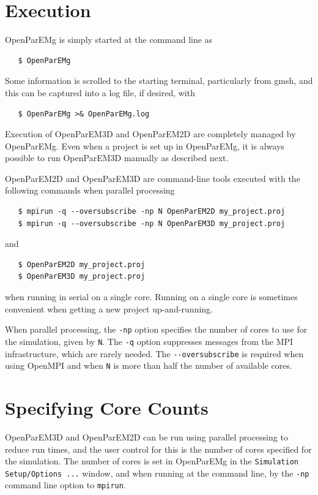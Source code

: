 \documentclass[titlepage]{article}
\renewcommand\_{\textunderscore\linebreak[1]}
\begin{document}
\section{Execution}

OpenParEMg is simply started at the command line as
\begin{verbatim}
   $ OpenParEMg
\end{verbatim}
Some information is scrolled to the starting terminal, particularly from gmsh, and this can be captured into a log file, if desired, with
\begin{verbatim}
   $ OpenParEMg >& OpenParEMg.log
\end{verbatim}
\noindent Execution of OpenParEM3D and OpenParEM2D are completely managed by OpenParEMg.  Even when a project is set up in OpenParEMg, it is always possible to run OpenParEM3D manually as described next.

OpenParEM2D and OpenParEM3D are command-line tools executed with the following commands when parallel processing
\begin{verbatim}
   $ mpirun -q --oversubscribe -np N OpenParEM2D my_project.proj 
   $ mpirun -q --oversubscribe -np N OpenParEM3D my_project.proj 
\end{verbatim}
and 
\begin{verbatim}
   $ OpenParEM2D my_project.proj
   $ OpenParEM3D my_project.proj
\end{verbatim}
when running in serial on a single core.  Running on a single core is sometimes convenient when getting a new project up-and-running.

When parallel processing, the \verb+-np+ option specifies the number of cores to use for the simulation, given by \verb+N+.  The \verb+-q+ option suppresses messages from the MPI infrastructure, which are rarely needed.  The \verb+--oversubscribe+ is required when using OpenMPI and when \verb+N+ is more than half the number of available cores.

\section{Specifying Core Counts}

OpenParEM3D and OpenParEM2D can be run using parallel processing to reduce run times, and the user control for this is the number of cores specified for the simulation.  The number of cores is set in OpenParEMg in the \texttt{Simulation Setup/Options ...} window, and when running at the command line, by the \verb+-np+ command line option to \texttt{mpirun}. 
\end{document}
